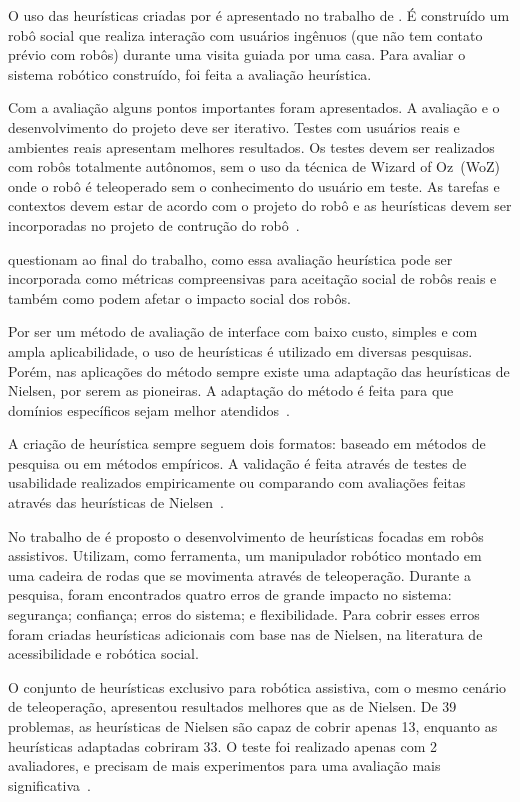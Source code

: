 O uso das heurísticas criadas por  é apresentado no trabalho de . É construído um robô social que realiza interação com usuários ingênuos (que não tem contato prévio com robôs) durante uma visita guiada por uma casa. Para avaliar o sistema robótico construído, foi feita a avaliação heurística.

Com a avaliação alguns pontos importantes foram apresentados. A avaliação e o desenvolvimento do projeto deve ser iterativo. Testes com usuários reais e ambientes reais apresentam melhores resultados. Os testes devem ser realizados com robôs totalmente autônomos, sem o uso da técnica de Wizard of Oz~(WoZ) onde o robô é teleoperado sem o conhecimento do usuário em teste. As tarefas e contextos devem estar de acordo com o projeto do robô e as heurísticas devem ser incorporadas no projeto de contrução do robô~\cite{lohse:2008}.

 questionam ao final do trabalho, como essa avaliação heurística pode ser incorporada como métricas compreensivas para aceitação social de robôs reais e também como podem afetar o impacto social dos robôs.

Por ser um método de avaliação de interface com baixo custo, simples e com ampla aplicabilidade, o uso de heurísticas é utilizado em diversas pesquisas. Porém, nas aplicações do método sempre existe uma adaptação das heurísticas de Nielsen, por serem as pioneiras. A adaptação do método é feita para que domínios específicos sejam melhor atendidos~\cite{tsui:2010}.

A criação de heurística sempre seguem dois formatos: baseado em métodos de pesquisa ou em métodos empíricos. A validação é feita através de testes de usabilidade realizados empiricamente ou comparando com avaliações feitas através das heurísticas de Nielsen~\cite{tsui:2010}.

No trabalho de  é proposto o desenvolvimento de heurísticas focadas em robôs assistivos. Utilizam, como ferramenta, um manipulador robótico montado em uma cadeira de rodas que se movimenta através de teleoperação. Durante a pesquisa, foram encontrados quatro erros de grande impacto no sistema: segurança; confiança; erros do sistema; e flexibilidade. Para cobrir esses erros foram criadas heurísticas adicionais com base nas de Nielsen, na literatura de acessibilidade e robótica social.

O conjunto de heurísticas exclusivo para robótica assistiva, com o mesmo cenário de teleoperação, apresentou resultados melhores que as de Nielsen. De 39 problemas, as heurísticas de Nielsen são capaz de cobrir apenas 13, enquanto as heurísticas adaptadas cobriram 33. O teste foi realizado apenas com 2 avaliadores, e precisam de mais experimentos para uma avaliação mais significativa~\cite{tsui:2010}.

